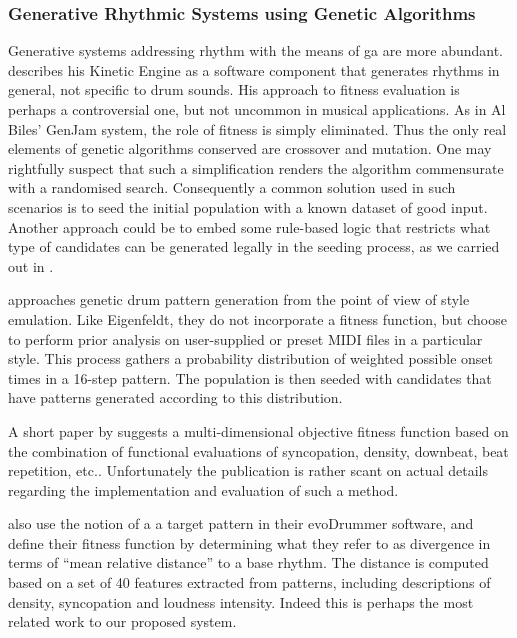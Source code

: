 \subsubsection{Generative Rhythmic Systems using Genetic Algorithms}

Generative systems addressing rhythm with the means of \acrshort{ga} are more abundant. \cite{Eigenfeldt2006a} describes his Kinetic Engine as a software component that generates rhythms in general, not specific to drum sounds. His approach to fitness evaluation is perhaps a controversial one, but not uncommon in musical applications. As in Al Biles’ GenJam system, the role of fitness is simply eliminated. Thus the only real elements of genetic algorithms conserved are crossover and mutation. One may rightfully suspect that such a simplification renders the algorithm commensurate with a randomised search. Consequently a common solution used in such scenarios is to seed the initial population with a known dataset of good input. Another approach could be to embed some rule-based logic that restricts what type of candidates can be generated legally in the seeding process, as we carried out in \citep{Nuanain2014}.

\cite{Bernardes2010} approaches genetic drum pattern generation from the point of view of style emulation. Like Eigenfeldt, they do not incorporate a fitness function, but choose to perform prior analysis on user-supplied or preset MIDI files in a particular style. This process gathers a probability distribution of weighted possible onset times in a 16-step pattern. The population is then seeded with candidates that have patterns generated according to this distribution. 

A short paper by \cite{Horowitz2004a} suggests a multi-dimensional objective fitness function based on the combination of functional evaluations of syncopation, density, downbeat, beat repetition, etc.. Unfortunately the publication is rather scant on actual details regarding the implementation and evaluation of such a method. 

\cite{Kaliakatsos-Papakostas2013} also use the notion of a a target pattern in their evoDrummer software, and define their fitness function by determining what they refer to as divergence in terms of “mean relative distance” to a base rhythm. The distance is computed based on a set of 40 features extracted from patterns, including descriptions of density, syncopation and loudness intensity. Indeed this is perhaps the most related work to our proposed system. 

